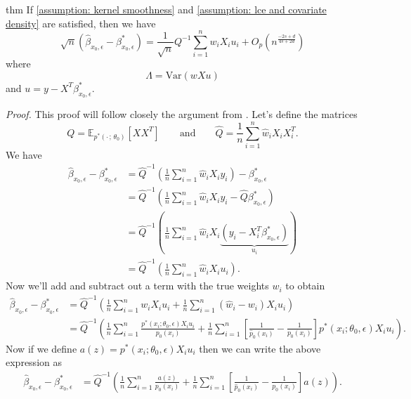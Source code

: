 \documentclass[11pt]{article}
\begin{document}
\begin{restatable}{thm}{} \label{thm: decomposition for beta}
    If \cref{assumption: kernel smoothness} and \cref{assumption: lce and covariate density} are satisfied, then we have
    \[\sqrt{n}\left(\hat{\beta}_{x_0, \epsilon} - \beta^*_{x_0, \epsilon}\right) = \frac{1}{\sqrt{n}}Q^{-1}\sum_{i = 1}^nw_iX_iu_i +O_p\left(n^{\frac{-2s+d}{4s+2d}}\right)\]
    where 
    \[\Lambda = \text{Var}(wXu)\]
    and $u = y - X^T\beta_{x_0, \epsilon}^*$.
\end{restatable}
\noindent \textit{Proof.} This proof will follow closely the argument from \citet{Newey_Ruud_2005}. Let's define the matrices
\begin{equation}
    Q = \mathbb{E}_{p^*(\cdot\,;\, \theta_0)}\left[XX^T\right] \qquad \text{and} \qquad \hat{Q} = \frac{1}{n}\sum_{i = 1}^n\hat{w}_iX_iX_i^T.
\end{equation}
We have
\begin{align}
    \hat{\beta}_{x_0, \epsilon} - \beta^*_{x_0, \epsilon} &= \hat{Q}^{-1}\left(\frac{1}{n}\sum_{i = 1}^n\hat{w}_iX_iy_i\right) - \beta^*_{x_0, \epsilon} \\
    &= \hat{Q}^{-1}\left(\frac{1}{n}\sum_{i = 1}^n\hat{w}_iX_iy_i - \hat{Q}\beta^*_{x_0, \epsilon}\right) \\
    &= \hat{Q}^{-1}\left(\frac{1}{n}\sum_{i = 1}^n\hat{w}_iX_i\underbrace{\left(y_i - X_i^T\beta^*_{x_0, \epsilon}\right)}_{u_i}\right) \\
    &= \hat{Q}^{-1}\left(\frac{1}{n}\sum_{i = 1}^n\hat{w}_iX_iu_i\right).
\end{align}
Now we'll add and subtract out a term with the true weights $w_i$ to obtain
\begin{align}
    \hat{\beta}_{x_0, \epsilon} - \beta^*_{x_0, \epsilon} &= \hat{Q}^{-1}\left(\frac{1}{n}\sum_{i = 1}^nw_iX_iu_i + \frac{1}{n}\sum_{i = 1}^n(\hat{w}_i - w_i)X_iu_i\right) \\
    &= \hat{Q}^{-1}\left(\frac{1}{n}\sum_{i = 1}^n\frac{p^*(x_i; \theta_0, \epsilon)X_iu_i}{p_0(x_i)} + \frac{1}{n}\sum_{i = 1}^n\left[\frac{1}{\hat{p}_0(x_i)} - \frac{1}{p_0(x_i)}\right]p^*(x_i; \theta_0, \epsilon)X_iu_i\right).
\end{align}
Now if we define $a(z) = p^*(x_i; \theta_0, \epsilon)X_iu_i$ then we can write the above expression as
\begin{align}
    \hat{\beta}_{x_0, \epsilon} - \beta^*_{x_0, \epsilon} &= \hat{Q}^{-1}\left(\frac{1}{n}\sum_{i = 1}^n\frac{a(z)}{p_0(x_i)} + \frac{1}{n}\sum_{i = 1}^n\left[\frac{1}{\hat{p}_0(x_i)} - \frac{1}{p_0(x_i)}\right]a(z)\right).
\end{align}
\end{document}

